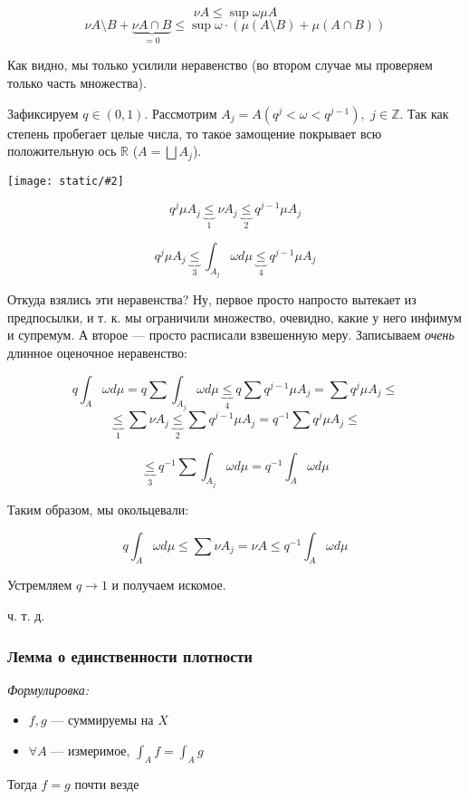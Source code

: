 \documentclass{article}
\def\dbl{\,\,}
\def\images#1#2{\begin{center}\texttt{[image: static/\#2]}\end{center}}
\begin{document}
\[\nu A \le \sup \omega \mu A\]
\[\nu A  \setminus B + \underbrace{\nu A \cap B}_{=0} \le \sup \omega \cdot ( \mu (A \setminus B) + \mu (A \cap B))\]

Как видно, мы только усилили неравенство (во втором случае мы проверяем только часть множества).

Зафиксируем $q \in (0, 1)$. Рассмотрим $A_j = A(q^j < \omega < q^{j - 1}), \dbl j \in \mathbb{Z}$. Так как степень пробегает целые числа, то такое замощение покрывает всю положительную ось $\mathbb{R}$ ($A = \bigsqcup A_j$).

\images{0.4}{kr_pl_2.jpg}

\[q^j \mu A_j \underbrace{\le}_{1} \nu A_j \underbrace{\le}_{2} q^{j - 1} \mu A_j\]

\[q^j \mu A_j \underbrace{\le}_{3} \int_{A_j} \omega d\mu \underbrace{\le}_{4} q^{j - 1} \mu A_j\]

Откуда взялись эти неравенства? Ну, первое просто напросто вытекает из предпосылки, и т. к. мы ограничили множество, очевидно, какие у него инфимум и супремум. А второе --- просто расписали взвешенную меру. Записываем \textit{очень} длинное оценочное неравенство:

\[q\int_{A} \omega d\mu = q\sum \int_{A_j} \omega d\mu \underbrace{\le}_{4} q \sum q^{j - 1} \mu A_j = \sum q^j \mu A_j \le\]
\[\underbrace{\le}_{1} \sum \nu A_j \underbrace{\le}_{2} \sum q^{j - 1} \mu A_j = q^{-1} \sum q^j \mu A_j \le \]

\[\underbrace{\le}_{3} q^{-1} \sum \int_{A_j} \omega d\mu = q^{-1} \int_{A} \omega d \mu\]

Таким образом, мы окольцевали:

\[q\int_{A} \omega d\mu \le \sum \nu A_j = \nu A \le q^{-1} \int_{A} \omega d \mu\]

Устремляем $q \rightarrow 1$ и получаем искомое.

ч. т. д. 

\subsubsection{Лемма о единственности плотности}
\textit{Формулировка:}

\begin{itemize}
    \item $f, g$ --- суммируемы на $X$
    \item $\forall A$ --- измеримое, $\int_{A} f = \int_{A} g$
\end{itemize}

Тогда $f = g$ почти везде
\end{document}
